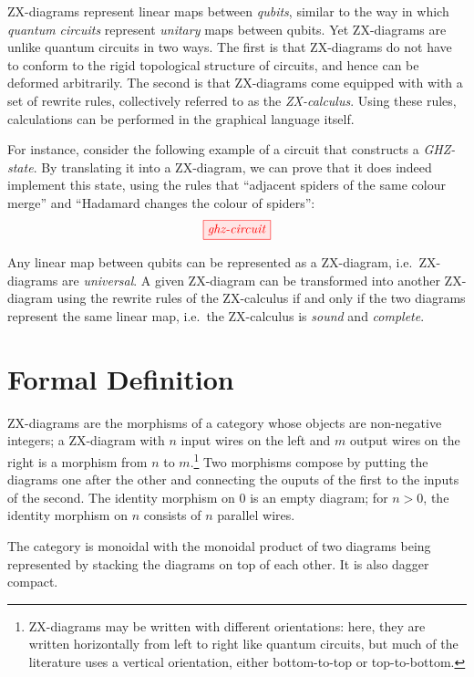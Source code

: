 \documentclass[a4paper, 12pt]{article}
\begin{document}
ZX-diagrams represent linear maps between \emph{qubits}, similar to the way in which \emph{quantum circuits} represent \emph{unitary} maps between qubits. Yet ZX-diagrams are unlike quantum circuits in two ways. The first is that ZX-diagrams do not have to conform to the rigid topological structure of circuits, and hence can be deformed arbitrarily. The second is that ZX-diagrams come equipped with with a set of rewrite rules, collectively referred to as the \emph{ZX-calculus}. Using these rules, calculations can be performed in the graphical language itself.

For instance, consider the following example of a circuit that constructs a \emph{GHZ-state}. By translating it into a ZX-diagram, we can prove that it does indeed implement this state, using the rules that ``adjacent spiders of the same colour merge'' and ``Hadamard changes the colour of spiders'':
\begin{equation*}
    \tikzfig{ghz-circuit}
\end{equation*}

Any linear map between qubits can be represented as a ZX-diagram, i.e.\ ZX-diagrams are \emph{universal}. A given ZX-diagram can be transformed into another ZX-diagram using the rewrite rules of the ZX-calculus if and only if the two diagrams represent the same linear map, i.e.\ the ZX-calculus is \emph{sound} %
and \emph{complete}. %

\section{Formal Definition}

ZX-diagrams are the morphisms of a category whose objects are non-negative integers; a ZX-diagram with $n$ input wires on the left and $m$ output wires on the right is a morphism from $n$ to $m$.\footnote{ZX-diagrams may be written with different orientations: here, they are written horizontally from left to right like quantum circuits, but much of the literature uses a vertical orientation, either bottom-to-top or top-to-bottom.}
Two morphisms compose by putting the diagrams one after the other and connecting the ouputs of the first to the inputs of the second.
The identity morphism on $0$ is an empty diagram; for $n>0$, the identity morphism on $n$ consists of $n$ parallel wires.

The category is monoidal with the monoidal product of two diagrams being represented by stacking the diagrams on top of each other. It is also dagger compact. %
\end{document}
